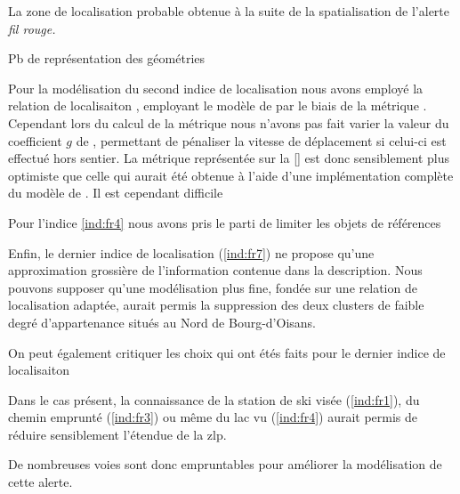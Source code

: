 La zone de localisation probable obtenue à la suite de la
spatialisation de l'alerte \emph{fil rouge.}


Pb de représentation des géométries

Pour la modélisation du second indice de localisation nous avons
employé la relation de localisaiton
, employant le modèle de
\textcite{Tobler1993} par le biais de la métrique
. Cependant lors du calcul de la métrique
nous n'avons pas fait varier la valeur du coefficient \(g\) de
\textcite{Tobler1993}, permettant de pénaliser la vitesse de
déplacement si celui-ci est effectué hors sentier. La métrique
représentée sur la \autoref{} est donc sensiblement plus optimiste que
celle qui aurait été obtenue à l'aide d'une implémentation complète du
modèle de \textcite{Tobler1993}.
%
Il est cependant difficile

Pour l'indice \ref{ind:fr4} nous avons pris le parti de limiter les
objets de références

Enfin, le dernier indice de localisation (\ref{ind:fr7}) ne propose
qu'une approximation grossière de l'information contenue dans la
description.
%
Nous pouvons supposer qu'une modélisation plus fine, fondée sur une
relation de localisation adaptée, aurait permis la suppression des
deux clusters de faible degré d'appartenance situés au Nord de
Bourg-d'Oisans.


On peut également critiquer les choix qui ont étés faits pour le
dernier indice de localisaiton

Dans le cas présent, la connaissance de la station de ski visée
(\ref{ind:fr1}), du chemin emprunté (\ref{ind:fr3}) ou même du lac vu
(\ref{ind:fr4}) aurait permis de réduire sensiblement l'étendue de la
\ac{zlp}.

De nombreuses voies sont donc empruntables pour améliorer la
modélisation de cette alerte.


